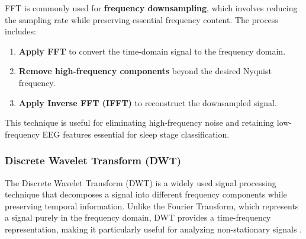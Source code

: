 FFT is commonly used for \textbf{frequency downsampling}, which involves reducing the sampling rate while preserving essential frequency content. The process includes:
\begin{enumerate}
    \item \textbf{Apply FFT} to convert the time-domain signal to the frequency domain.
    \item \textbf{Remove high-frequency components} beyond the desired Nyquist frequency.
    \item \textbf{Apply Inverse FFT (IFFT)} to reconstruct the downsampled signal.
\end{enumerate}
This technique is useful for eliminating high-frequency noise and retaining low-frequency EEG features essential for sleep stage classification.

\subsubsection*{Discrete Wavelet Transform (DWT)}

The Discrete Wavelet Transform (DWT) is a widely used signal processing technique that decomposes a signal into different frequency components while preserving temporal information. Unlike the Fourier Transform, which represents a signal purely in the frequency domain, DWT provides a time-frequency representation, making it particularly useful for analyzing non-stationary signals \parencite{mallat1999wavelet}. \\

